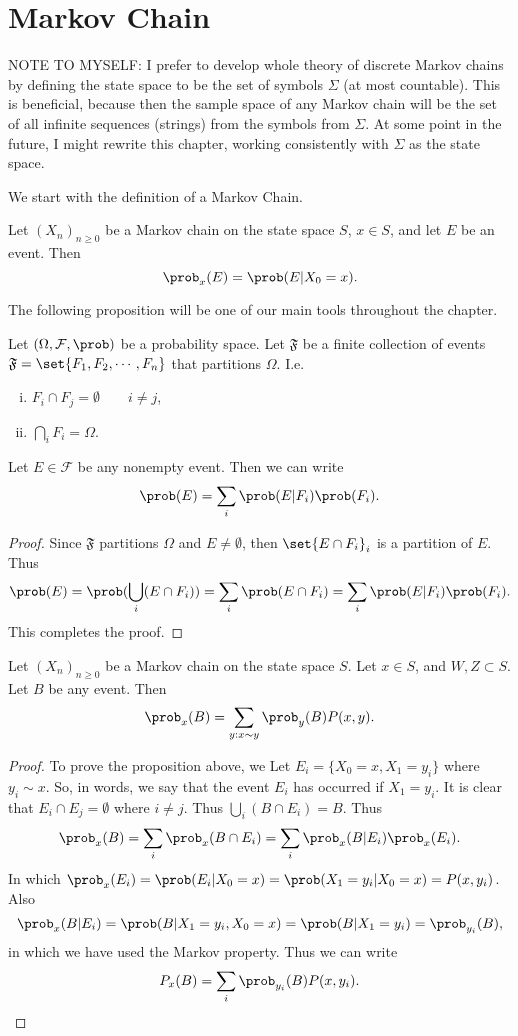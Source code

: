 \chapter{Markov Chain}
NOTE TO MYSELF: I prefer to develop whole theory of discrete Markov chains by defining the state space to be the set of symbols $\Sigma$ (at most countable). This is beneficial, because then the sample space of any Markov chain will be the set of all infinite sequences (strings) from the symbols from $\Sigma$. At some point in the future, I might rewrite this chapter, working consistently with $\Sigma$ as the state space.

We start with the definition of a Markov Chain.
\begin{notation}
	Let $(X_n)_{n\geq0}$ be a Markov chain on the state space $S$, $x\in S$, and let $E$ be an event. Then
	\[  \prob_x(E) = \prob(E|X_0=x) . \]
\end{notation}
The following proposition will be one of our main tools throughout the chapter.
\begin{proposition}
	Let $(\Omega, \mathcal{F}, \prob)$ be a probability space. Let $\mathfrak{F}$ be a finite collection of events $\mathfrak{F} = \set{F_1,F_2,\cdots, F_n}$ that partitions $\Omega$. I.e.
	\begin{enumerate}[(i)]
		\item $F_i \cap F_j = \emptyset \qquad i\neq j$,
		\item $\bigcap_{i} F_i = \Omega$.
	\end{enumerate}
	Let $E \in \mathcal{F}$ be any nonempty event. Then we can write
	\[  \prob(E) = \sum_{i} \prob(E|F_i)\prob(F_i). \]
\end{proposition}
\begin{proof}
	Since $\mathfrak{F}$ partitions $\Omega$ and $E \neq \emptyset$, then $\set{E\cap F_i}_i$ is a partition of $E$. Thus
	\[ \prob(E) = \prob(\bigcup_i (E \cap F_i)) = \sum_i \prob(E \cap F_i) = \sum_i \prob(E|F_i)\prob(F_i). \]
	This completes the proof.
\end{proof}



\begin{proposition}
	Let $(X_n)_{n\geq 0}$ be a Markov chain on the state space $S$. Let $x\in S$, and $W,Z \subset S$. Let $B$ be any event. Then
	\[ \prob_x(B) = \sum_{y:x\sim y} \prob_y(B)P(x,y). \]
	\label{prop:FirstTimeStepArgument}
\end{proposition}
\begin{proof}
	To prove the proposition above, we Let $E_i = \{ X_0=x, X_1=y_i \}$ where $y_i \sim x$. So, in words, we say that the event $E_i$ has occurred if $X_1 = y_i$. It is clear that $E_i \cap E_j = \emptyset$ where $i\neq j$. Thus $\bigcup_{i}(B\cap E_i) = B$. Thus 
	\[ \prob_x(B) = \sum_{i} \prob_x(B \cap E_i) = \sum_{i}\prob_x(B|E_i)\prob_x(E_i). \]
	In which $\prob_x(E_i) = \prob(E_i|X_0=x) = \prob(X_1=y_i|X_0=x) = P(x,y_i)  $. Also \[\prob_x(B|E_i) = \prob(B|X_1=y_i, X_0=x) = \prob(B|X_1=y_i) = \prob_{y_i}(B),\]
	in which we have used the Markov property. Thus we can write
	\[ P_x(B) = \sum_i \prob_{y_i}(B)P(x,y_i). \]
\end{proof}


